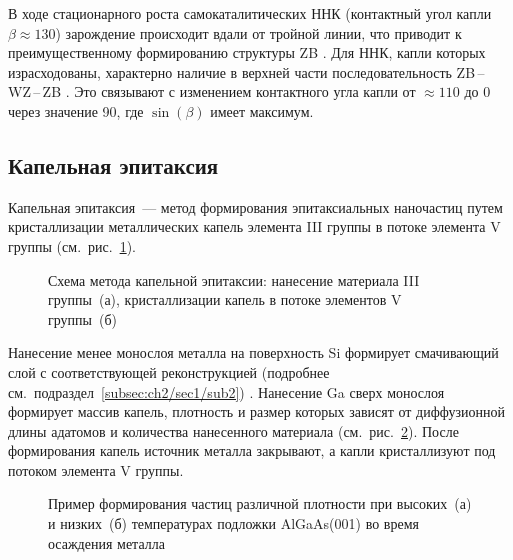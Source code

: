 В ходе стационарного роста самокаталитических ННК (контактный угол капли
\(\beta\approx 130\){\textdegree}) зарождение происходит вдали от тройной
линии, что приводит к преимущественному формированию структуры ZB
\cite{Cirlin2010}. Для ННК, капли которых израсходованы, характерно наличие в
верхней части последовательность ZB\,--\,WZ\,--\,ZB \cite{Spirkoska2009,
Ambrosini2011}. Это связывают с изменением контактного угла капли от \(\approx
110\){\textdegree} до 0{\textdegree} через значение 90{\textdegree}, где
\(\sin(\beta)\) имеет максимум.

\subsection{Капельная эпитаксия}\label{subsec:ch1/sec2/sub6}

Капельная эпитаксия~--- метод формирования эпитаксиальных наночастиц путем
кристаллизации металлических капель элемента III группы в потоке элемента V
группы (см.~рис.~\cref{fig:Image_8_1}).

\begin{figure}[ht]  \caption{Схема метода
	капельной эпитаксии: нанесение материала III группы~(а), кристаллизации
капель в потоке элементов V группы~(б) \cite{Gurioli2019}}\label{fig:Image_8_1}
\end{figure}

Нанесение менее монослоя металла на поверхность Si формирует смачивающий слой с
соответствующей реконструкцией (подробнее
см.~подраздел~\cref{subsec:ch2/sec1/sub2}) \cite{Park1988}. Нанесение Ga сверх
монослоя формирует массив капель, плотность и размер которых зависят от
диффузионной длины адатомов и количества нанесенного материала
(см.~рис.~\cref{fig:Image_8_2}). После формирования капель источник металла
закрывают, а капли кристаллизуют под потоком элемента V группы.

\begin{figure}[ht]  \caption{Пример
	формирования частиц различной плотности при высоких~(а) и низких~(б)
температурах подложки AlGaAs(001) во время осаждения металла
\cite{Gurioli2019}}\label{fig:Image_8_2} \end{figure}

